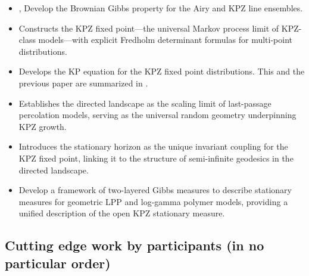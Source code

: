 \documentclass[10pt]{article}
\numberwithin{equation}{section}
\theoremstyle{plain}
\theoremstyle{plain}
\theoremstyle{definition}
\begin{document}
\begin{itemize}
	\item
		\cite{corwin2014brownian},
		\cite{CorwinHammond2013}
		Develop the Brownian Gibbs property for the Airy and KPZ line ensembles.
	\item
		\cite{matetski2017kpz}
		Constructs the KPZ fixed point—the universal Markov process limit of KPZ-class models—with explicit Fredholm determinant formulas for multi-point distributions.
	\item \cite{quastel2019kp}
		Develops the KP equation for the KPZ fixed point distributions.
		This and the previous paper are
		summarized in
		\cite{remenik2023integrable}.


	\item
		\cite{directed_landscape}
		Establishes the directed landscape as the scaling limit of last-passage percolation models, serving as the universal random geometry underpinning KPZ growth.

	\item
		\cite{Busani2022}
		Introduces the stationary horizon as the unique invariant coupling for the KPZ fixed point, linking it to the structure of semi-infinite geodesics in the directed landscape.

	\item
		\cite{BarraquandCorwinYang2023}
		Develop a framework of two-layered Gibbs measures to describe stationary measures for geometric LPP and log-gamma polymer models, providing a unified description of the open KPZ stationary measure.


\end{itemize}

\subsection*{Cutting edge work by participants (in no particular order)}
\end{document}
